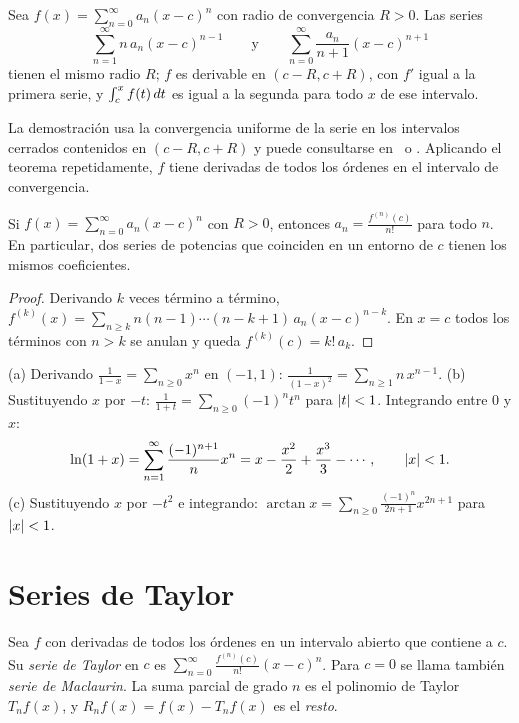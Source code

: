 \begin{teorema}\label{teo:termino-a-termino}
Sea $f(x)=\sum_{n=0}^{\infty}a_n(x-c)^{n}$ con radio de convergencia $R>0$. Las series
\[
\sum_{n=1}^{\infty}n\,a_n(x-c)^{n-1}\qquad\text{y}\qquad\sum_{n=0}^{\infty}\frac{a_n}{n+1}(x-c)^{n+1}
\]
tienen el mismo radio $R$; $f$ es derivable en $(c-R,c+R)$, con $f'$ igual a la primera serie, y $\int_c^{x}f(t)\mathop{}\!d t$ es igual a la segunda para todo $x$ de ese intervalo.
\end{teorema}

La demostración usa la convergencia uniforme de la serie en los intervalos cerrados contenidos en $(c-R,c+R)$ y puede consultarse en~\cite[cap.~24]{spivak} o \cite[cap.~11]{apostol}. Aplicando el teorema repetidamente, $f$ tiene derivadas de todos los órdenes en el intervalo de convergencia.

\begin{corolario}\label{cor:coeficientes}
Si $f(x)=\sum_{n=0}^{\infty}a_n(x-c)^{n}$ con $R>0$, entonces $a_n=\frac{f^{(n)}(c)}{n!}$ para todo $n$. En particular, dos series de potencias que coinciden en un entorno de $c$ tienen los mismos coeficientes.
\end{corolario}

\begin{proof}
Derivando $k$ veces término a término, $f^{(k)}(x)=\sum_{n\ge k}n(n-1)\cdots(n-k+1)\,a_n(x-c)^{n-k}$. En $x=c$ todos los términos con $n>k$ se anulan y queda $f^{(k)}(c)=k!\,a_k$.
\end{proof}

\begin{ejemplo}\label{ej:desde-geometrica}
(a) Derivando $\frac{1}{1-x}=\sum_{n\ge0}x^{n}$ en $(-1,1)$: $\frac{1}{(1-x)^{2}}=\sum_{n\ge1}n\,x^{n-1}$.
(b) Sustituyendo $x$ por $-t$: $\frac{1}{1+t}=\sum_{n\ge0}(-1)^{n}t^{n}$ para $\lvert t\rvert<1$. Integrando entre $0$ y $x$:
\[
\ln(1+x)=\sum_{n=1}^{\infty}\frac{(-1)^{n+1}}{n}x^{n}=x-\frac{x^{2}}{2}+\frac{x^{3}}{3}-\cdots,\qquad\lvert x\rvert<1 .
\]
(c) Sustituyendo $x$ por $-t^{2}$ e integrando: $\arctan x=\sum_{n\ge0}\frac{(-1)^{n}}{2n+1}x^{2n+1}$ para $\lvert x\rvert<1$.
\end{ejemplo}

\section{Series de Taylor}

\begin{definicion}\label{def:serie-taylor}
Sea $f$ con derivadas de todos los órdenes en un intervalo abierto que contiene a $c$. Su \emph{serie de Taylor} en $c$ es $\sum_{n=0}^{\infty}\frac{f^{(n)}(c)}{n!}(x-c)^{n}$. Para $c=0$ se llama también \emph{serie de Maclaurin}. La suma parcial de grado $n$ es el polinomio de Taylor $T_nf(x)$, y $R_nf(x)=f(x)-T_nf(x)$ es el \emph{resto}.
\end{definicion}

